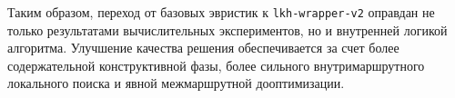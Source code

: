 \documentclass[a4paper,12pt]{article}
\begin{document}
Таким образом, переход от базовых эвристик к \texttt{lkh-wrapper-v2} оправдан не только
результатами вычислительных экспериментов, но и внутренней логикой алгоритма. Улучшение
качества решения обеспечивается за счет более содержательной конструктивной фазы, более
сильного внутримаршрутного локального поиска и явной межмаршрутной дооптимизации.

\printbibliography[title={Список литературы}]
\end{document}
